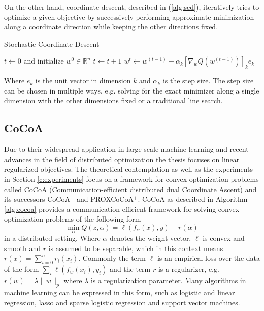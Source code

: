 On the other hand, coordinate descent, described in (\ref{alg:scd}), iteratively tries to optimize a given objective by successively performing approximate minimization along a coordinate direction while keeping the other directions fixed.
\begin{algorithm}
\caption{Stochastic Coordinate Descent}\label{alg:scd}
\begin{algorithmic}[1]
\State $t\gets 0$ and initialize $w^0 \in \mathbb{R}^n$
\Repeat
\State $t \gets t + 1$
\State $w^{t} \gets w^{(t-1)} - \alpha_k[\nabla_wQ(w^{(t-1)})]_ke_k$
\EndFor
{}
\end{algorithmic}
\end{algorithm}
Where $e_k$ is the unit vector in dimension $k$ and $\alpha_k$ is the step size.
The step size can be chosen in multiple ways, e.g. solving for the exact minimizer along a single dimension with the other dimensions fixed or a traditional line search.

\subsection{CoCoA}
Due to their widespread application in large scale machine learning and recent advances in the field of distributed optimization the thesis focuses on linear regularized objectives.
The theoretical contemplation as well as the experiments in Section \ref{c:experiments} focus on a framework for convex optimization problems called CoCoA (Communication-efficient distributed dual Coordinate Ascent) \cite{Jaggi2014} and its successors CoCoA$^+$\cite{smith2015l1} and PROXCoCoA$^+$\cite{smith2016cocoa}.
CoCoA as described in Algorithm \ref{alg:cocoa} provides a communication-efficient framework for solving convex optimization problems of the following form
\begin{equation}
\min_{\alpha} Q(z,\alpha) = \ell(f_\alpha(x),y) + r(\alpha)
\label{eqn:lin_loss}
\end{equation}
in a distributed setting.
Where $\alpha$ denotes the weight vector, $\ell$ is convex and smooth and $r$ is assumed to be separable, which in this context means $r(x) = \sum_{i=0}^nr_i(x_i)$.
Commonly the term $\ell$ is an empirical loss over the data of the form $\sum_{i} \ell(f_w(x_i), y_i)$ and the term $r$ is a regularizer, e.g. $r(w) = \lambda\|w\|_p$ where $\lambda$ is a regularization parameter.
Many algorithms in machine learning can be expressed in this form, such as logistic and linear regression, lasso and sparse logistic regression and support vector machines.

